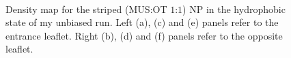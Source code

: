 \begin{figure}[p]
{		}\\%
	\caption{Density map for the striped (\acs{MUS}:\acs{OT} $1$:$1$) \acs{NP} in the hydrophobic state of my unbiased run. Left (a), (c) and (e) panels refer to the entrance leaflet. Right (b), (d) and (f) panels refer to the opposite leaflet.}%
	\label{fig:stripedDensity}
\end{figure}
%

